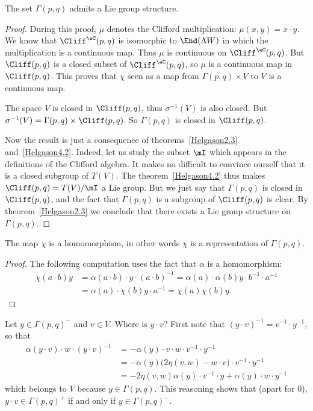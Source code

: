 \begin{proposition}
	The set $\Gamma(p,q)$ admits a Lie group structure.
\end{proposition}
\begin{proof}

	During this proof, $\mu$ denotes the Clifford multiplication: $\mu(x,y)=x\cdot y$. We know that $\Cliff^{\eC}(p,q)$ is isomorphic to $\End(\Lambda W)$ in which the multiplication is a continuous map. Thus $\mu$ is continuous on $\Cliff^{\eC}(p,q)$. But $\Cliff(p,q)$ is a closed subset of $\Cliff^{\eC}(p,q)$, so $\mu$ is a continuous map in $\Cliff(p,q)$. This proves that  $\chi$ seen as a map from $\Gamma(p,q)\times V$ to $V$ is a continuous map.

	The space $V$ is closed in $\Cliff(p,q)$, thus $\sigma^{-1}(V)$ is also closed. But $\sigma^{-1}(V)=\Gamma(p,q)\times\Cliff(p,q)$. So $\Gamma(p,q)$ is closed in $\Cliff(p,q)$.

	Now the result is just a consequence of theorems~\ref{Helgason2.3} and~\ref{Helgason4.2}. Indeed, let us study the subset $\mI$ which appears in the definitions of the Clifford algebra. It makes no difficult to convince ourself that it is a closed subgroup of $T(V)$. The theorem~\ref{Helgason4.2} thus makes $\Cliff(p,q)=T(V)/\mI$ a Lie group. But we just say that $\Gamma(p,q)$ is closed in $\Cliff(p,q)$, and the fact that $\Gamma(p,q)$ is a subgroup of $\Cliff(p,q)$ is clear. By theorem~\ref{Helgason2.3} we conclude that there exists a Lie group structure on $\Gamma(p,q)$.
\end{proof}

\begin{lemma}
	The map $\chi$ is a homomorphism, in other words $\chi$ is a representation of $\Gamma(p,q)$.
\end{lemma}

\begin{proof}
	The following computation uses the fact that $\alpha$ is a homomorphism:
	\[
		\begin{split}
			\chi(a\cdot b)y&=\alpha(a\cdot b)\cdot y\cdot (a\cdot b)^{-1}
			=\alpha(a)\cdot\alpha(b)y\cdot b^{-1}\cdot a^{-1}\\
			&=\alpha(a)\cdot\chi(b)y\cdot a^{-1}
			=\chi(a)\chi(b)y.
		\end{split}
	\]
\end{proof}
Let $y\in\Gamma(p,q)^-$ and $v\in V$. Where is $y\cdot v$? First note that $(y\cdot v)^{-1}=v^{-1}\cdot y^{-1}$, so that
\begin{equation}
	\begin{split}
		\alpha(y\cdot v)\cdot w\cdot(y\cdot v)^{-1}&=-\alpha(y)\cdot v\cdot w\cdot v^{-1}\cdot y^{-1}\\
		&=-\alpha(y)\big( 2\eta(v,w)-w\cdot v \big)\cdot v^{-1}\cdot y^{-1}\\
		&=-2\eta(v,w)\alpha(y)\cdot v^{-1}\cdot y+\alpha(y)\cdot w\cdot y^{-1}
	\end{split}
\end{equation}
which belongs to $V$ because $y\in\Gamma(p,q)$. This reasoning shows that (apart for $0$), $y\cdot v\in\Gamma(p,q)^+$ if and only if $y\in\Gamma(p,q)^-$.

